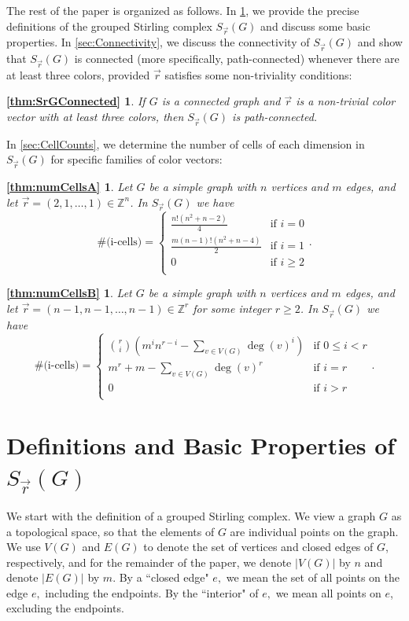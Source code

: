 \documentclass{amsart}
\newcommand{\Sr}{S_{\vec{r}}}
\newcommand{\Z}{\mathbb{Z}}
\newtheorem*{thm1}{\cref{thm:SrGConnected}}
\newtheorem*{thm2}{\cref{thm:numCellsA}}
\newtheorem*{thm3}{\cref{thm:numCellsB}}
\theoremstyle{definition}
\theoremstyle{remark}
\begin{document}
The rest of the paper is organized as follows. In \cref{sec:Basics}, we provide the precise definitions of the grouped Stirling complex $\Sr(G)$ and discuss some basic properties. In \cref{sec:Connectivity}, we discuss the connectivity of $\Sr(G)$ and show that $\Sr(G)$ is connected (more specifically, path-connected) whenever there are at least three colors, provided $\vec r$ satisfies some non-triviality conditions:

\begin{thm1}
    If $G$ is a connected graph and $\vec r$ is a non-trivial color vector with at least three colors, then $\Sr(G)$ is path-connected.
\end{thm1} In \cref{sec:CellCounts}, we determine the number of cells of each dimension in $\Sr(G)$ for specific families of color vectors:

\begin{thm2}
       Let $G$ be a simple graph with $n$ vertices and $m$ edges, and let $\vec{r}=(2,1,\dots,1)\in\Z^n$. In $\Sr(G)$ we have 
    \[
    \#(\text{i-cells)}=\begin{cases}
        \frac{n!(n^2+n-2)}{4}&\text{if }i=0\\
        \frac{m(n-1)!(n^2+n-4)}{2}&\text{if }i=1\\
        0&\text{if }i\ge 2\\
    \end{cases}.
    \]
\end{thm2}

\begin{thm3}
 Let $G$ be a simple graph with $n$ vertices and $m$ edges, and let $\vec{r}=(n-1,n-1,\dots,n-1)\in\Z^r$ for some integer $r\ge 2$. In $\Sr(G)$ we have 
    \[
    \#(\text{i-cells)}=\begin{cases}\displaystyle
        \binom{r}{i}\left(m^in^{r-i}-\displaystyle\sum_{v\in V(G)}\deg(v)^i\right)&\text{if }0\le i<r\\
        m^r+m-\displaystyle\sum_{v\in V(G)}\deg(v)^r&\text{if }i=r\\
        0&\text{if }i> r\\
    \end{cases}.
    \]
\end{thm3}
\section{Definitions and Basic Properties of $\Sr(G)$}\label{sec:Basics}

We start with the definition of a grouped Stirling complex. We view a graph $G$ as a topological space, so that the elements of $G$ are individual points on the graph. We use $V(G)$ and $E(G)$ to denote the set of vertices and closed edges of $G$, respectively, and for the remainder of the paper, we denote $|V(G)|$ by $n$ and denote $|E(G)|$ by $m.$ By a ``closed edge" $e,$ we mean the set of all points on the edge $e,$ including the endpoints. By the ``interior" of $e,$ we mean all points on $e$, excluding the endpoints.
\end{document}
